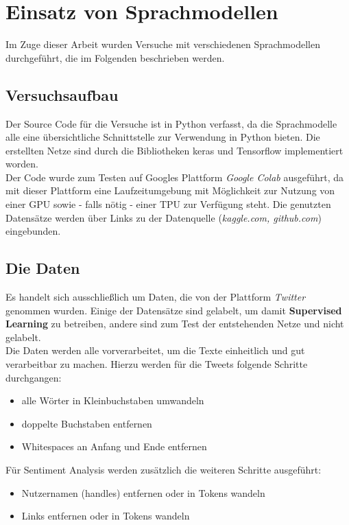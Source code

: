 \chapter{Einsatz von Sprachmodellen}
Im Zuge dieser Arbeit wurden Versuche mit verschiedenen Sprachmodellen durchgef\"uhrt, die im Folgenden beschrieben werden.

\section{Versuchsaufbau}
Der Source Code f\"ur die Versuche ist in Python verfasst, da die Sprachmodelle alle eine \"ubersichtliche Schnittstelle zur Verwendung in Python bieten. Die erstellten Netze sind durch die Bibliotheken keras \cite{keras} und Tensorflow \cite{tensorflow} implementiert worden. \\
Der Code wurde zum Testen auf Googles Plattform \textit{Google Colab} \cite{colab} ausgef\"uhrt, da mit dieser Plattform eine Laufzeitumgebung mit M\"oglichkeit zur Nutzung von einer GPU sowie - falls n\"otig - einer TPU zur Verf\"ugung steht. Die genutzten Datens\"atze werden \"uber Links zu der Datenquelle (\textit{kaggle.com, github.com}) eingebunden.


\section{Die Daten}
Es handelt sich ausschlie{\ss}lich um Daten, die von der Plattform \textit{Twitter} genommen wurden. Einige der Datens\"atze sind gelabelt, um damit \textbf{Supervised Learning} zu betreiben, andere sind zum Test der entstehenden Netze und nicht gelabelt.\\
Die Daten werden alle vorverarbeitet, um die Texte einheitlich und gut verarbeitbar zu machen. Hierzu werden f\"ur die Tweets folgende Schritte durchgangen:
\begin{itemize}
\item alle W\"orter in Kleinbuchstaben umwandeln
\item doppelte Buchstaben entfernen %
\item Whitespaces an Anfang und Ende entfernen

\end{itemize}
F\"ur Sentiment Analysis werden zus\"atzlich die weiteren Schritte ausgef\"uhrt:
\begin{itemize}
\item Nutzernamen (handles) entfernen oder in Tokens wandeln
\item Links entfernen oder in Tokens wandeln
\end{itemize}

